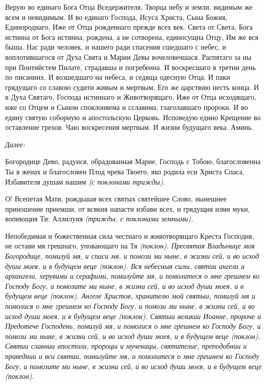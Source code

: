 Верую во единаго Бога Отца Вседержителя, Творца небу и земли, видимым же всем и невидимым. И во единаго Господа, Исуса Христа, Сына Божия, Единороднаго, Иже от Отца рожденнаго прежде всех век. Света от Света, Бога истинна от Бога истинна, рождена, а не сотворена, единосущна Отцу, Им же вся быша. Нас ради человек, и нашего ради спасения сшедшаго с небес, и воплотившагося от Духа Свята и Марии Девы вочеловечшася. Распятаго за ны при Понтийстем Пилате, страдавша и погребенна. И воскресшаго в третии день по писаниих. И возшедшаго на небеса, и седяща одесную Отца. И паки грядущаго со славою судити живым и мертвым, Его же царствию несть конца. И в Духа Святаго, Господа истиннаго и Животворящаго, Иже от Отца исходящаго, иже со Отцем и Сыном споклоняема и сславима, глаголавшаго пророки. И во едину святую соборную и апостольскую Церковь. Исповедую едино Крещение во оставление грехов. Чаю воскресения мертвым. И жизни будущаго века. Аминь.


\itshape Далее:\normalfont{}


Богородице Дево, радуися, обрадованная Марие, Господь с Тобою, благословенна Ты в женах и благословен Плод чрева Твоего, яко родила еси Христа Спаса, Избавителя душам нашим \itshape (с поклонами трижды)\normalfont{}.


О! Всепетая Мати, рождьшая всех святых святейшее Слово, нынешнее приношение приемши, от всякия напасти избави всех, и грядущия изми муки, вопиющия Ти: Аллилуия \itshape (трижды, с поклонами земными)\normalfont{}.


Непобедимая и божественная сила честнаго и животворящаго Креста Господня, не остави мя грешнаго, уповающаго на Тя \itshape (поклон)\normalfont{}. Пресвятая Владычице моя Богородице, помилуй мя, и спаси мя, и помози ми ныне, в жизни сей, и во исход души моея, и в будущем веце \itshape (поклон)\normalfont{}. Вся небесныя силы, святии ангели и архангели, херувими и серафими, помилуйте мя, и помолитеся о мне грешнем ко Господу Богу, и помозите ми ныне, в жизни сей, и во исход души моея, и в будущем веце \itshape (поклон)\normalfont{}. Ангеле Христов, хранителю мой святыи, помилуй мя и помолися о мне грешнем ко Господу Богу, и помози ми ныне, в жизни сей, и во исход души моея, и в будущем веце \itshape (поклон)\normalfont{}. Святыи великии Иоанне, пророче и Предотече Господень, помилуй мя, и помолися о мне грешнем ко Господу Богу, и помози ми ныне, в жизни сей, и во исход души моея, и в будущем веце \itshape (поклон)\normalfont{}. Святии славнии апостоли, пророцы и мученицы, святителие, преподобнии и праведнии и вси святии, помилуйте мя, и помолитеся о мне грешнем ко Господу Богу, и помозите ми ныне, в жизни сей, и во исход души моея, и в будущем веце \itshape (поклон)\normalfont{}.


